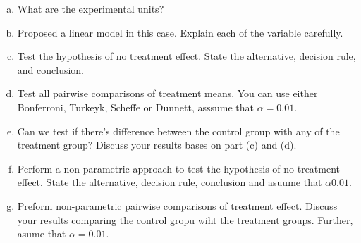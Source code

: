 \documentclass{article}
\begin{document}
\begin{enumerate}[(a)]
	\item What are the experimental units?
	\item Proposed a linear model in this case. Explain each of the variable carefully.
	\item Test the hypothesis of no treatment effect. State the alternative, decision rule, and conclusion.
	\item Test all pairwise comparisons of treatment means. You can use either Bonferroni, Turkeyk, Scheffe or Dunnett, asssume that $\alpha = 0.01$.
	\item Can we test if there's difference between the control group with any of the treatment group? Discuss your results bases on part (c) and (d).
	\item Perform a non-parametric approach to test the hypothesis of no treatment effect. State the alternative, decision rule, conclusion and asuume that $\alpha 0.01$.
	\item Preform non-parametric pairwise comparisons of treatment effect. Discuss your results comparing the control gropu wiht the treatment groups.
	      Further, asume that $\alpha = 0.01$.
\end{enumerate}
\end{document}
